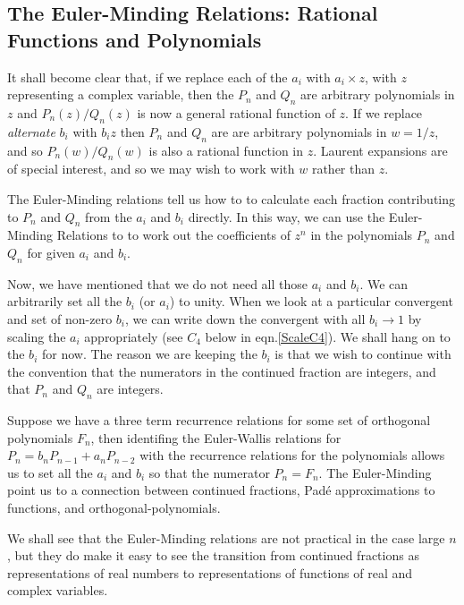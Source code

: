 \documentclass[16pt]{article}
\numberwithin{equation}{section}
\numberwithin{figure}{section}
\numberwithin{figure}{section}
\numberwithin{equation}{section}
\begin{document}
\subsection{The Euler-Minding Relations: Rational Functions and Polynomials}


It shall become clear that, if we replace each of the $a_i$ with $a_i \times z$, with $z$ representing
 a complex variable, then the $P_n$ and $Q_n$ are arbitrary polynomials in $z$ and $P_n(z)/Q_n(z)$
is now a general rational function of $z$. If we replace 
{\em alternate} $b_i$ with $b_i z$ then $P_n$ and $Q_n$ are  are arbitrary polynomials in $w=1/z$,
and so $P_n(w)/Q_n(w)$ is also a rational function in $z$. Laurent expansions are of special interest,
 and so we may wish to work with $w$ rather than $z$.

The Euler-Minding relations tell us how to to calculate each fraction contributing 
to $P_n$ and 
$Q_n$  from the $a_i$ and $b_i$ directly.
In this way, we can use the Euler-Minding Relations to to work out the
 coefficients of $z^n$ in the polynomials
$P_n$ and $Q_n$ for given $a_i$ and $b_i$.

Now, we have mentioned that we do not need all those $a_i$ and $b_i$. We can arbitrarily
set all the $b_i$ (or $a_i$) to unity. When we look at a particular convergent 
and set of non-zero $b_i$, we can write down the convergent with all $b_i\rightarrow 1$
 by scaling the $a_i$ appropriately (see $C_4$ below in eqn.\ref{ScaleC4}).
 We shall hang on to the $b_i$ for now. The reason we are keeping the $b_i$
 is that we wish to continue with the convention that the numerators in the
continued fraction are integers, and that $P_n$ and $Q_n$ are integers.

Suppose we have a three term recurrence relations for some set of orthogonal polynomials $F_n$,
then identifing the Euler-Wallis relations for $P_n=b_n P_{n-1}+a_n P_{n-2}$ with
the recurrence relations for the polynomials allows us to set all the $a_i$ and $b_i$
 so that the numerator $P_n=F_n$. The Euler-Minding point us to a connection between
continued fractions, Pad{\'e} approximations to functions, and orthogonal-polynomials.

We shall see that the Euler-Minding relations are not  practical in the case large $n$,
 but they do make it easy to see the transition from continued fractions as representations
 of real numbers to representations of functions of real and complex variables.
\end{document}
